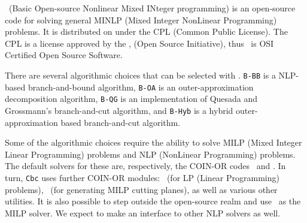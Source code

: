 
\begin{htmlonly}
\begin{PageSummary}
\end{PageSummary}


\begin{quickref}
\end{quickref}
\end{htmlonly}
\Bonmin\ (Basic Open-source Nonlinear Mixed INteger programming)
is an open-source code for solving general MINLP (Mixed
Integer NonLinear Programming) problems.
 It is distributed on
\COINOR
{}
under the CPL (Common Public
License). The CPL is a license approved by the
,
(Open Source Initiative),
 thus \Bonmin\ is OSI
Certified Open Source Software.

There are several algorithmic choices that can be selected with \Bonmin.
{\tt B-BB} is a NLP-based branch-and-bound algorithm,
{\tt B-OA} is an
outer-ap\-prox\-i\-ma\-tion decomposition algorithm, {\tt B-QG} is an
implementation of  Quesada and Grossmann's branch-and-cut algorithm,
and {\tt B-Hyb} is a hybrid outer-ap\-prox\-i\-ma\-tion based
branch-and-cut algorithm.


Some of the algorithmic choices require the ability to solve MILP
(Mixed Integer Linear Programming) problems and NLP (NonLinear
Programming) problems. The default solvers for these are,
respectively, the COIN-OR codes \Cbc\ and \Ipopt. In turn,
{\tt Cbc} uses further COIN-OR modules: \Clp\ (for LP (Linear
Programming) problems), \Cgl\ (for generating MILP cutting
planes), as well as various other utilities. It is also possible to
step outside the open-source realm and use
\Cplex\ as the MILP solver. We expect to make an interface to other NLP solvers as well.

